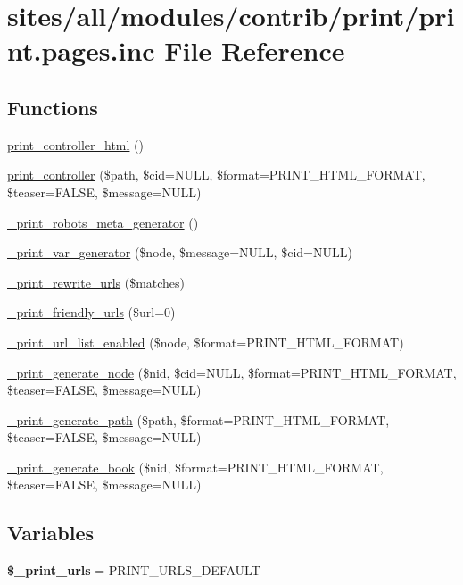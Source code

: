 \hypertarget{print_8pages_8inc}{
\section{sites/all/modules/contrib/print/print.pages.inc File Reference}
\label{print_8pages_8inc}
}
\subsection*{Functions}
\begin{CompactItemize}
\item 
\hyperlink{print_8pages_8inc_d0694de8f2f026781bf81915d7921512}{print\_\-controller\_\-html} ()
\item 
\hyperlink{print_8pages_8inc_aef613d2eb4448233d3600d0d7259e95}{print\_\-controller} (\$path, \$cid=NULL, \$format=PRINT\_\-HTML\_\-FORMAT, \$teaser=FALSE, \$message=NULL)
\item 
\hyperlink{print_8pages_8inc_7bed1c6226e0320365d86f2ccae2343c}{\_\-print\_\-robots\_\-meta\_\-generator} ()
\item 
\hyperlink{print_8pages_8inc_3f1f36e3e7024c0e0a1bbca71250c571}{\_\-print\_\-var\_\-generator} (\$node, \$message=NULL, \$cid=NULL)
\item 
\hyperlink{print_8pages_8inc_6e4a373faef7d99aa5bae041d6716b5e}{\_\-print\_\-rewrite\_\-urls} (\$matches)
\item 
\hyperlink{print_8pages_8inc_8bee3b0f76672324086e88fe6e7c8276}{\_\-print\_\-friendly\_\-urls} (\$url=0)
\item 
\hyperlink{print_8pages_8inc_bb60369f083f953df28e49d688f2856f}{\_\-print\_\-url\_\-list\_\-enabled} (\$node, \$format=PRINT\_\-HTML\_\-FORMAT)
\item 
\hyperlink{print_8pages_8inc_c1145058f38f60736aadfe1b67ad9e12}{\_\-print\_\-generate\_\-node} (\$nid, \$cid=NULL, \$format=PRINT\_\-HTML\_\-FORMAT, \$teaser=FALSE, \$message=NULL)
\item 
\hyperlink{print_8pages_8inc_034f39dad1e6de6b874b38bc9ba6df44}{\_\-print\_\-generate\_\-path} (\$path, \$format=PRINT\_\-HTML\_\-FORMAT, \$teaser=FALSE, \$message=NULL)
\item 
\hyperlink{print_8pages_8inc_6081aae9c9ef906ea6d53fd2eaf3e97c}{\_\-print\_\-generate\_\-book} (\$nid, \$format=PRINT\_\-HTML\_\-FORMAT, \$teaser=FALSE, \$message=NULL)
\end{CompactItemize}
\subsection*{Variables}
\begin{CompactItemize}
\item 
\hypertarget{print_8pages_8inc_794e6853ef1d969785eac6b57a17a90c}{
\textbf{\$\_\-print\_\-urls} = PRINT\_\-URLS\_\-DEFAULT}
\label{print_8pages_8inc_794e6853ef1d969785eac6b57a17a90c}

\end{CompactItemize}


